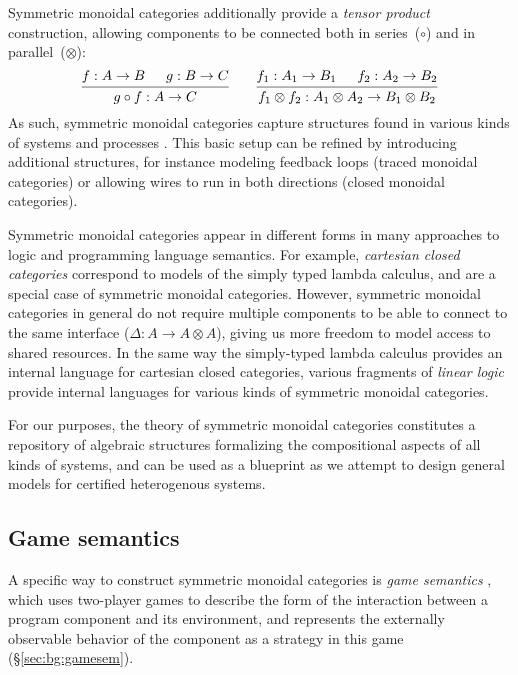 \documentclass[draft,11pt]{report}
\theoremstyle{definition}
\begin{document}
Symmetric monoidal categories
additionally provide a \emph{tensor product} construction,
allowing components to be connected
both in series~($\circ$) and in parallel~($\otimes$):
\[
  \begin{prooftree}
    \hypo{f : A \rightarrow B}
    \hypo{g : B \rightarrow C}
    \infer2{g \circ f : A \rightarrow C}
  \end{prooftree}
  \qquad
  \begin{prooftree}
    \hypo{f_1 : A_1 \rightarrow B_1}
    \hypo{f_2 : A_2 \rightarrow B_2}
    \infer2{f_1 \otimes f_2 : A_1 \otimes A_2 \rightarrow B_1 \otimes B_2}
  \end{prooftree}
\]
As such,
symmetric monoidal categories capture structures found
in various kinds of systems and processes \citep{rosetta}.
This basic setup can be refined by introducing additional structures,
for instance modeling
feedback loops (traced monoidal categories) or allowing
wires to run in both directions
(closed monoidal categories).

Symmetric monoidal categories appear in different forms
in many approaches to logic and programming language semantics.
For example,
\emph{cartesian closed categories}
correspond
to models of the simply typed lambda calculus,
and are a special case of symmetric monoidal categories.
However,
symmetric monoidal categories in general do not require
multiple components to be able to connect to the same interface
($\Delta : A \rightarrow A \otimes A$),
giving us more freedom to model access to shared resources.
In the same way the simply-typed lambda calculus provides
an internal language for cartesian closed categories,
various fragments of \emph{linear logic} provide
internal languages for various kinds of symmetric monoidal categories.

For our purposes,
the theory of symmetric monoidal categories
constitutes a repository of algebraic structures
formalizing the compositional aspects of
all kinds of systems,
and can be used as a blueprint
as we attempt to design general models
for certified heterogenous systems.


\subsection{Game semantics} %

A specific way to construct symmetric monoidal categories
is \emph{game semantics} \citep{cspgs},
which uses two-player games to describe
the form of the interaction between a program component and its environment,
and represents the externally observable behavior
of the component as a strategy in this game
(\S\ref{sec:bg:gamesem}).
\end{document}
